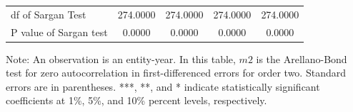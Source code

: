 \begin{table}[H]
\begin{threeparttable}
\begin{tabular}{l|c c| c c}
df of Sargan Test& 274.0000         & 274.0000         & 274.0000         & 274.0000         \\
P value of Sargan test&   0.0000         &   0.0000         &   0.0000         &   0.0000         \\
    \bottomrule
  \end{tabular} 
\begin{tablenotes}
\small
\item Note: An observation is an entity-year. In this table, $m2$ is the Arellano-Bond test for zero autocorrelation in first-differenced errors for order two. Standard errors are in parentheses. ***, **, and * indicate statistically significant coefficients at 1\%, 5\%, and 10\% percent levels, respectively.
 \end{tablenotes}
 \end{threeparttable}
\end{table}

